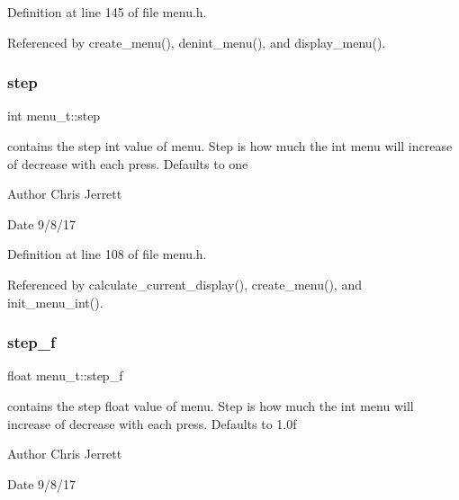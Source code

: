 Definition at line 145 of file menu.\+h.



Referenced by create\+\_\+menu(), denint\+\_\+menu(), and display\+\_\+menu().

\mbox{\label{structmenu__t_adc50450bc59ea66a8d67424adc46e24e}} 
\subsubsection{\texorpdfstring{step}{step}}
{\footnotesize\ttfamily int menu\+\_\+t\+::step}



contains the step int value of menu. Step is how much the int menu will increase of decrease with each press. Defaults to one 

\begin{DoxyAuthor}{Author}
Chris Jerrett 
\end{DoxyAuthor}
\begin{DoxyDate}{Date}
9/8/17 
\end{DoxyDate}


Definition at line 108 of file menu.\+h.



Referenced by calculate\+\_\+current\+\_\+display(), create\+\_\+menu(), and init\+\_\+menu\+\_\+int().

\mbox{\label{structmenu__t_a84cfd9226f6554c63ca9f4b11f94d12d}} 
\subsubsection{\texorpdfstring{step\+\_\+f}{step\_f}}
{\footnotesize\ttfamily float menu\+\_\+t\+::step\+\_\+f}



contains the step float value of menu. Step is how much the int menu will increase of decrease with each press. Defaults to 1.\+0f 

\begin{DoxyAuthor}{Author}
Chris Jerrett 
\end{DoxyAuthor}
\begin{DoxyDate}{Date}
9/8/17 
\end{DoxyDate}



